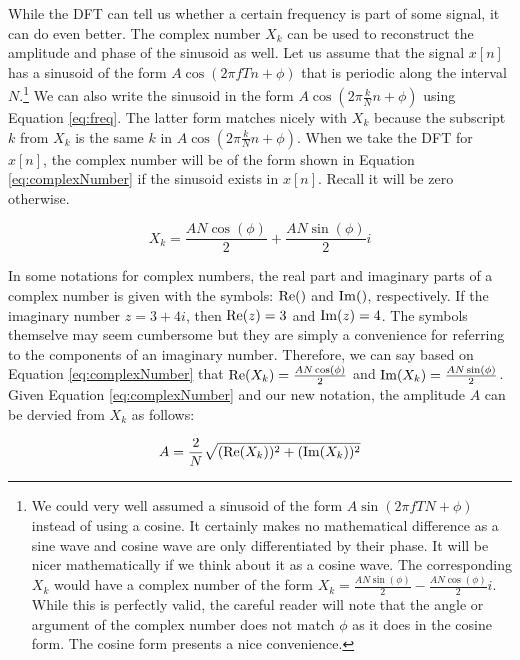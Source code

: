 While the DFT can tell us whether a certain frequency is part of some signal, it can do even better.  The complex
number $X_k$ can be used to reconstruct the amplitude and phase of the sinusoid as well.  Let us assume that
the signal $x[n]$ has a sinusoid of the form $A\cos(2\pi f Tn + \phi)$  that is periodic along the interval
 $N$.\footnote{We could very well assumed a sinusoid of the form $A\sin(2\pi fTN + \phi)$ instead of using a 
cosine.  It certainly makes no mathematical difference as a sine wave and cosine wave are only differentiated
by their phase.  It will be nicer mathematically if we think about it as a cosine wave.  The corresponding
$X_k$ would have a complex number of the form $	X_k = \frac{AN\sin(\phi)}{2} - \frac{AN\cos(\phi)}{2}i$. While this is perfectly valid, the careful reader will note that the angle or argument of the complex number
does not match $\phi$ as it does in the cosine form.  The cosine form presents a nice convenience.}  
We can also write the sinusoid in the form $A\cos(2 \pi \frac{k}{N} n + \phi)$ using Equation \ref{eq:freq}.  The
latter form matches nicely with $X_k$ because the subscript $k$ from $X_k$ is the same $k$ in 
$A\cos(2 \pi \frac{k}{N} n + \phi)$.  When we take the DFT for $x[n]$,  the complex number will be of the form
shown in Equation \ref{eq:complexNumber} if the sinusoid exists in $x[n]$.  Recall it will be zero otherwise.

\begin{equation}
	\label{eq:complexNumber}
	X_k = \frac{AN\cos(\phi)}{2} + \frac{AN\sin(\phi)}{2}i
\end{equation}

 In some notations for complex numbers, the real part and imaginary parts of a complex number is 
 given with the symbols: $\mathrm{Re}()$ and $\mathrm{Im}()$, respectively.  If the imaginary number $z = 3 + 4i$, then
 $\mathrm{Re}(z) = 3$ and $\mathrm{Im}(z) = 4$.  The symbols themselve may seem cumbersome but they are
 simply a convenience for referring to the components of an imaginary number.  Therefore, we can say
 based on Equation \ref{eq:complexNumber} that $\mathrm{Re}(X_k) = \frac{AN\cos(\phi)}{2}$ and $\mathrm{Im}(X_k) = 
 \frac{AN\sin(\phi)}{2}$.  Given Equation \ref{eq:complexNumber} and our new notation, the amplitude $A$ 
 can be dervied from $X_k$ as follows:


\begin{equation}
\label{eq:amplitude}
	A = \frac{2}{N}\sqrt{(\mathrm{Re}(X_k))^2 + (\mathrm{Im}(X_k))^2}
\end{equation}

